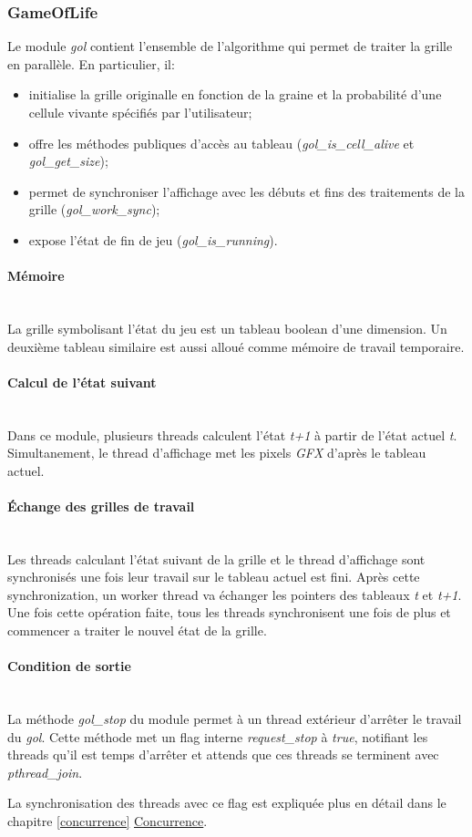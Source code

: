 \documentclass[11pt, a4paper]{article}
\newcommand{\paragraphnl}[1]{\paragraph{#1}\mbox{}\\}
\begin{document}
\subsubsection{GameOfLife}
Le module \textit{gol} contient l'ensemble de l'algorithme qui permet de traiter la grille en parallèle. En particulier, il:

\begin{itemize}
	\item initialise la grille originalle en fonction de la graine et la probabilité d'une cellule vivante spécifiés par l'utilisateur;
	\item offre les méthodes publiques d'accès au tableau (\textit{gol\_is\_cell\_alive} et \textit{gol\_get\_size});
	\item permet de synchroniser l'affichage avec les débuts et fins des traitements de la grille (\textit{gol\_work\_sync});
	\item expose l'état de fin de jeu (\textit{gol\_is\_running}).
\end{itemize}

\paragraphnl{Mémoire}
La grille symbolisant l'état du jeu est un tableau boolean d'une dimension. Un deuxième tableau similaire est aussi alloué comme mémoire de travail temporaire.

\paragraphnl{Calcul de l'état suivant}
Dans ce module, plusieurs threads calculent l'état \textit{t+1} à partir de l'état actuel \textit{t}. Simultanement, le thread d'affichage met les pixels \textit{GFX} d'après le tableau actuel.

\paragraphnl{Échange des grilles de travail}
Les threads calculant l'état suivant de la grille et le thread d'affichage sont synchronisés une fois leur travail sur le tableau actuel est fini. Après cette synchronization, un worker thread va échanger les pointers des tableaux \textit{t} et \textit{t+1}. Une fois cette opération faite, tous les threads synchronisent une fois de plus et commencer a traiter le nouvel état de la grille.

\paragraphnl{Condition de sortie}
La méthode \textit{gol\_stop} du module permet à un thread extérieur d'arrêter le travail du \textit{gol}. Cette méthode met un flag interne \textit{request\_stop} à \textit{true}, notifiant les threads qu'il est temps d'arrêter et attends que ces threads se terminent avec \textit{pthread\_join}.

La synchronisation des threads avec ce flag est expliquée plus en détail dans le chapitre \ref{concurrence} \hyperref[concurrence]{Concurrence}.
\end{document}
